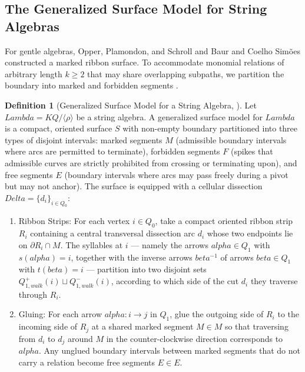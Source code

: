 \documentclass[11pt,a4paper,reqno]{amsart}
\def\mathcal#1{#1}%
\def\mathbb#1{#1}%
\def\mathrm#1{#1}%
\def\K{K}%
\def\forb{F}%
\def\alpha{alpha}%
\def\beta{beta}%
\def\Delta{Delta}%
\def\Lambda{Lambda}%
\def\emph#1{#1}%
\def\textbf#1{#1}%
\theoremstyle{definition}
\newtheorem{definition}[theorem]{Definition}
\theoremstyle{remark}
\newcommand{\K}{\mathbb{K}}
\newcommand{\forb}{\mathfrak{F}}
\begin{document}
\subsection{The Generalized Surface Model for String Algebras}
\label{subsec:surface_model}

For gentle algebras, Opper, Plamondon, and Schroll \cite{OPS2018} and Baur and Coelho Sim\~oes \cite{BCS2020} constructed a marked ribbon surface. To accommodate monomial relations of arbitrary length $k \ge 2$ that may share overlapping subpaths, we partition the boundary into marked and forbidden segments \cite{Brustle2020}.

\begin{definition}[Generalized Surface Model for a String Algebra, \cite{OPS2018, BCS2020, Brustle2020}]
\label{def:generalized_surface}
Let $\Lambda = \K\mathcal{Q}/\langle\rho\rangle$ be a string algebra. A \emph{generalized surface model} for $\Lambda$ is a compact, oriented surface $\mathcal{S}$ with non-empty boundary partitioned into three types of disjoint intervals: \emph{marked segments} $\mathcal{M}$ (admissible boundary intervals where arcs are permitted to terminate), \emph{forbidden segments} $\forb$ (spikes that admissible curves are strictly prohibited from crossing or terminating upon), and \emph{free segments} $\mathcal{E}$ (boundary intervals where arcs may pass freely during a pivot but may not anchor). The surface is equipped with a cellular dissection $\Delta = \{d_i\}_{i \in Q_0}$:
\begin{enumerate}
    \item \textbf{Ribbon Strips:} For each vertex $i \in Q_0$, take a compact oriented ribbon strip $R_i$ containing a central transversal dissection arc $d_i$ whose two endpoints lie on $\partial R_i \cap \mathcal{M}$. The \emph{syllables at $i$} --- namely the arrows $\alpha \in Q_1$ with $s(\alpha)=i$, together with the inverse arrows $\beta^{-1}$ of arrows $\beta \in Q_1$ with $t(\beta)=i$ --- partition into two disjoint sets $Q_{1,\mathrm{walk}}^+(i) \sqcup Q_{1,\mathrm{walk}}^-(i)$, according to which side of the cut $d_i$ they traverse through $R_i$.
    \item \textbf{Gluing:} For each arrow $\alpha \colon i \to j$ in $Q_1$, glue the outgoing side of $R_i$ to the incoming side of $R_j$ at a shared marked segment $M \in \mathcal{M}$ so that traversing from $d_i$ to $d_j$ around $M$ in the counter-clockwise direction corresponds to $\alpha$. Any unglued boundary intervals between marked segments that do not carry a relation become free segments $E \in \mathcal{E}$.

\end{enumerate}
\end{definition}
\end{document}
